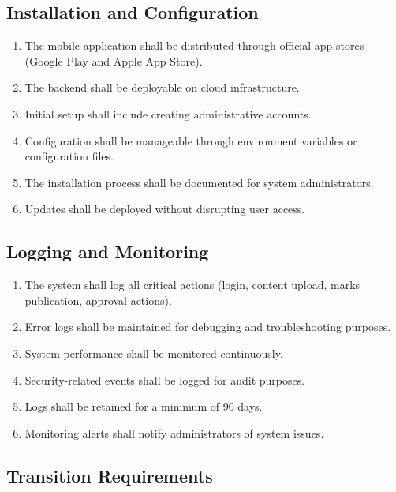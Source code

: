 \documentclass[12pt,a4paper]{article}
\begin{document}
\subsection{Installation and Configuration}

\begin{enumerate}[leftmargin=*, label=\textbf{IC-\arabic*.}, itemsep=4pt]
  \item The mobile application shall be distributed through official app stores (Google Play and Apple App Store).
  \item The backend shall be deployable on cloud infrastructure.
  \item Initial setup shall include creating administrative accounts.
  \item Configuration shall be manageable through environment variables or configuration files.
  \item The installation process shall be documented for system administrators.
  \item Updates shall be deployed without disrupting user access.
\end{enumerate}

\subsection{Logging and Monitoring}

\begin{enumerate}[leftmargin=*, label=\textbf{LM-\arabic*.}, itemsep=4pt]
  \item The system shall log all critical actions (login, content upload, marks publication, approval actions).
  \item Error logs shall be maintained for debugging and troubleshooting purposes.
  \item System performance shall be monitored continuously.
  \item Security-related events shall be logged for audit purposes.
  \item Logs shall be retained for a minimum of 90 days.
  \item Monitoring alerts shall notify administrators of system issues.
\end{enumerate}

\subsection{Transition Requirements}
\end{document}
